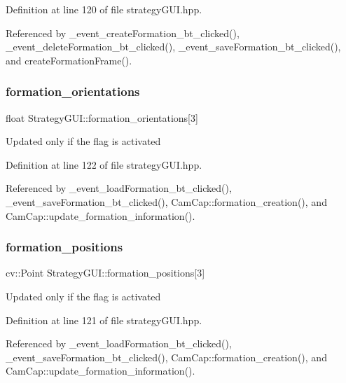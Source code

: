 Definition at line 120 of file strategy\+G\+U\+I.\+hpp.



Referenced by \+\_\+event\+\_\+create\+Formation\+\_\+bt\+\_\+clicked(), \+\_\+event\+\_\+delete\+Formation\+\_\+bt\+\_\+clicked(), \+\_\+event\+\_\+save\+Formation\+\_\+bt\+\_\+clicked(), and create\+Formation\+Frame().

\mbox{\label{class_strategy_g_u_i_ad8d7e6bbfceba5d6284c8825f37ea8a2}} 
\subsubsection{\texorpdfstring{formation\+\_\+orientations}{formation\_orientations}}
{\footnotesize\ttfamily float Strategy\+G\+U\+I\+::formation\+\_\+orientations\mbox{[}3\mbox{]}}

Updated only if the flag is activated 

Definition at line 122 of file strategy\+G\+U\+I.\+hpp.



Referenced by \+\_\+event\+\_\+load\+Formation\+\_\+bt\+\_\+clicked(), \+\_\+event\+\_\+save\+Formation\+\_\+bt\+\_\+clicked(), Cam\+Cap\+::formation\+\_\+creation(), and Cam\+Cap\+::update\+\_\+formation\+\_\+information().

\mbox{\label{class_strategy_g_u_i_a4d2d15fe0a25b8d9d8fa56a4cf155ff0}} 
\subsubsection{\texorpdfstring{formation\+\_\+positions}{formation\_positions}}
{\footnotesize\ttfamily cv\+::\+Point Strategy\+G\+U\+I\+::formation\+\_\+positions\mbox{[}3\mbox{]}}

Updated only if the flag is activated 

Definition at line 121 of file strategy\+G\+U\+I.\+hpp.



Referenced by \+\_\+event\+\_\+load\+Formation\+\_\+bt\+\_\+clicked(), \+\_\+event\+\_\+save\+Formation\+\_\+bt\+\_\+clicked(), Cam\+Cap\+::formation\+\_\+creation(), and Cam\+Cap\+::update\+\_\+formation\+\_\+information().

